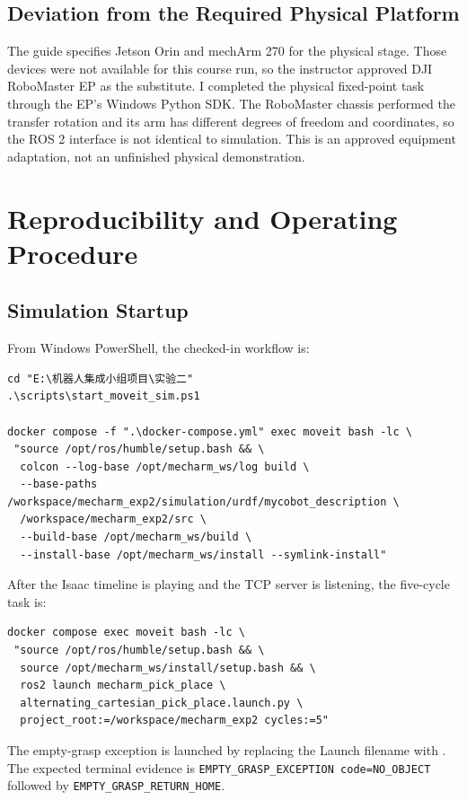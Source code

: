 \documentclass[UTF8,zihao=-4,scheme=chinese,fontset=none]{ctexart}
\begin{document}
\subsection{Deviation from the Required Physical Platform}
The guide specifies Jetson Orin and mechArm 270 for the physical stage. Those devices were not available for this course run, so the instructor approved DJI RoboMaster EP as the substitute. I completed the physical fixed-point task through the EP's Windows Python SDK. The RoboMaster chassis performed the transfer rotation and its arm has different degrees of freedom and coordinates, so the ROS 2 interface is not identical to simulation. This is an approved equipment adaptation, not an unfinished physical demonstration.

\section{Reproducibility and Operating Procedure}
\subsection{Simulation Startup}
From Windows PowerShell, the checked-in workflow is:
\begin{lstlisting}[caption={Build and start the simulation runtime}]
cd "E:\机器人集成小组项目\实验二"
.\scripts\start_moveit_sim.ps1

docker compose -f ".\docker-compose.yml" exec moveit bash -lc \
 "source /opt/ros/humble/setup.bash && \
  colcon --log-base /opt/mecharm_ws/log build \
  --base-paths /workspace/mecharm_exp2/simulation/urdf/mycobot_description \
  /workspace/mecharm_exp2/src \
  --build-base /opt/mecharm_ws/build \
  --install-base /opt/mecharm_ws/install --symlink-install"
\end{lstlisting}
After the Isaac timeline is playing and the TCP server is listening, the five-cycle task is:
\begin{lstlisting}[caption={Run five alternating simulation cycles}]
docker compose exec moveit bash -lc \
 "source /opt/ros/humble/setup.bash && \
  source /opt/mecharm_ws/install/setup.bash && \
  ros2 launch mecharm_pick_place \
  alternating_cartesian_pick_place.launch.py \
  project_root:=/workspace/mecharm_exp2 cycles:=5"
\end{lstlisting}
The empty-grasp exception is launched by replacing the Launch filename with . The expected terminal evidence is \texttt{EMPTY\_GRASP\_EXCEPTION code=NO\_OBJECT} followed by \texttt{EMPTY\_GRASP\_RETURN\_HOME}.
\end{document}
